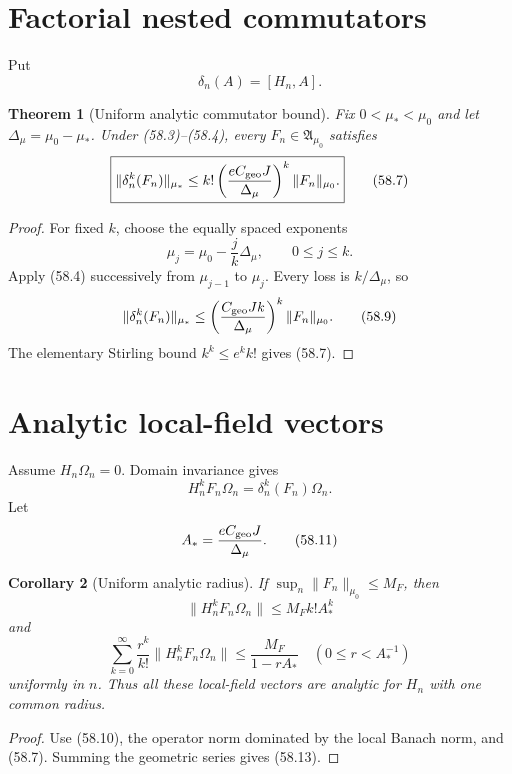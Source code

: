 \documentclass[11pt]{article}
\newtheorem{theorem}{Theorem}[section]
\newtheorem{corollary}[theorem]{Corollary}
\theoremstyle{remark}
\begin{document}
\section{Factorial nested commutators}

Put
\[
 \delta_n(A)=[H_n,A].
\]

\begin{theorem}[Uniform analytic commutator bound]
\label{thm:v15v58-factorial}
Fix \(0<\mu_*<\mu_0\) and let
\(\Delta_\mu=\mu_0-\mu_*\).  Under (58.3)--(58.4), every
\(F_n\in{\mathfrak A}_{\mu_0}\) satisfies
\[
 \boxed{
 \|\delta_n^k(F_n)\|_{\mu_*}
 \leq k!
 \left(\frac{eC_{\rm geo}J}{\Delta_\mu}\right)^k
 \|F_n\|_{\mu_0}.}                                      \tag{58.7}
\]
\end{theorem}

\begin{proof}
For fixed \(k\), choose the equally spaced exponents
\[
 \mu_j=\mu_0-\frac{j}{k}\Delta_\mu,
 \qquad 0\leq j\leq k.                                  \tag{58.8}
\]
Apply (58.4) successively from \(\mu_{j-1}\) to \(\mu_j\).
Every loss is \(k/\Delta_\mu\), so
\[
 \|\delta_n^k(F_n)\|_{\mu_*}
 \leq
 \left(\frac{C_{\rm geo}Jk}{\Delta_\mu}\right)^k
 \|F_n\|_{\mu_0}.                                      \tag{58.9}
\]
The elementary Stirling bound \(k^k\leq e^kk!\) gives (58.7).
\end{proof}

\section{Analytic local-field vectors}

Assume \(H_n\Omega_n=0\).  Domain invariance gives
\[
 H_n^kF_n\Omega_n=\delta_n^k(F_n)\Omega_n.              \tag{58.10}
\]
Let
\[
 A_*=\frac{eC_{\rm geo}J}{\Delta_\mu}.                  \tag{58.11}
\]

\begin{corollary}[Uniform analytic radius]
\label{cor:v15v58-analytic}
If
\(\sup_n\|F_n\|_{\mu_0}\leq M_F\), then
\[
 \|H_n^kF_n\Omega_n\|
 \leq M_Fk!A_*^k                                       \tag{58.12}
\]
and
\[
 \sum_{k=0}^\infty\frac{r^k}{k!}
 \|H_n^kF_n\Omega_n\|
 \leq\frac{M_F}{1-rA_*}
 \quad(0\leq r<A_*^{-1})                               \tag{58.13}
\]
uniformly in \(n\).  Thus all these local-field vectors are analytic
for \(H_n\) with one common radius.
\end{corollary}

\begin{proof}
Use (58.10), the operator norm dominated by the local Banach norm,
and (58.7).  Summing the geometric series gives (58.13).
\end{proof}
\end{document}
